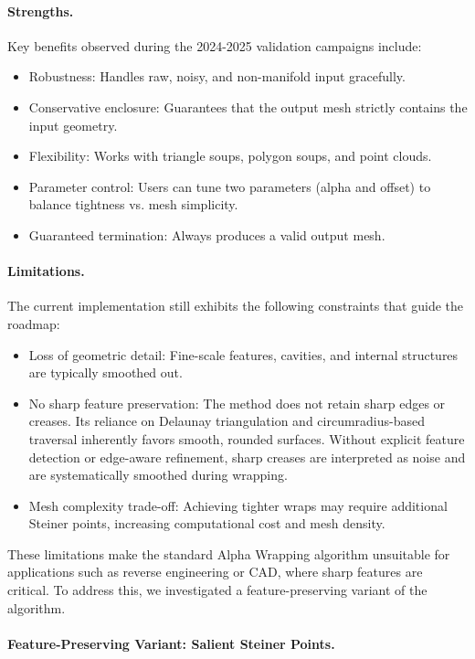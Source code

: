 \paragraph{Strengths.}
Key benefits observed during the 2024-2025 validation campaigns include:
\begin{itemize}
\item Robustness: Handles raw, noisy, and non-manifold input gracefully.
\item Conservative enclosure: Guarantees that the output mesh strictly contains the input geometry.
\item Flexibility: Works with triangle soups, polygon soups, and point clouds.
\item Parameter control: Users can tune two parameters (alpha and offset) to balance tightness vs. mesh simplicity.
\item Guaranteed termination: Always produces a valid output mesh.
\end{itemize}

\paragraph{Limitations.}
The current implementation still exhibits the following constraints that guide the roadmap:
\begin{itemize}
\item Loss of geometric detail: Fine-scale features, cavities, and internal structures are typically smoothed out.
\item No sharp feature preservation: The method does not retain sharp edges or creases. Its reliance on Delaunay triangulation and circumradius-based traversal inherently favors smooth, rounded surfaces. Without explicit feature detection or edge-aware refinement, sharp creases are interpreted as noise and are systematically smoothed during wrapping.
\item Mesh complexity trade-off: Achieving tighter wraps may require additional Steiner points, increasing computational cost and mesh density.
\end{itemize}

These limitations make the standard Alpha Wrapping algorithm unsuitable for applications such as reverse engineering or CAD, where sharp features are critical. To address this, we investigated a feature-preserving variant of the algorithm.

\paragraph{Feature-Preserving Variant: Salient Steiner Points.}

